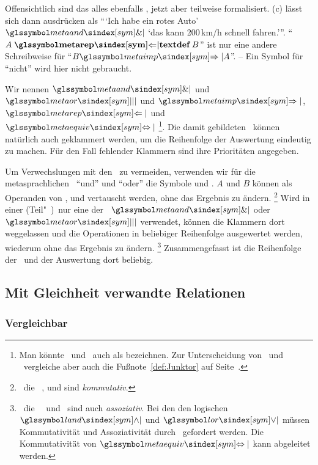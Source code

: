 Offensichtlich sind das alles ebenfalls \Aussagen, jetzt aber teilweise formalisiert.
(c) lässt sich dann ausdrücken als \enquote{\enquote{Ich habe ein rotes Auto} $\symmetaand$ \enquote{das kann 200\,km/h schnell fahren.}}.
\enquote{$A \bindefinition{\symmetarep} B$} ist nur eine andere Schreibweise für \enquote{$B \symmetaimp A$}.
-- Ein Symbol für \enquote{nicht} wird hier nicht gebraucht.

Wir nennen $\symmetaand$ und $\symmetaor$  und $\symmetaimp$, $\symmetarep$ und $\symmetaequiv$ %
\footnote{%
	Man könnte \Metaoperationen\ und \Metarelationen\ auch als  bezeichnen. Zur Unterscheidung von \Operationen\ und \Relationen\ vergleiche aber auch die Fußnote~\ref{def:Junktor} auf Seite~\pageref{def:Junktor}.
}.
Die damit gebildeten \Aussagen\ können natürlich auch geklammert werden, um die Reihenfolge der Auswertung eindeutig zu machen.
Für den Fall fehlender Klammern sind ihre Prioritäten  angegeben.

Um Verwechslungen mit den \Junktoren\ zu vermeiden, verwenden wir für die metasprachlichen \Operationen\ \enquote{und} und \enquote{oder} die Symbole \chrqt{\symmetaand} und \chrqt{\symmetaor}.
$A$ und $B$ können als Operanden von \chrqt{\symmetaequiv}, \chrqt{\symmetaand} und \chrqt{\symmetaor} vertauscht werden, ohne das Ergebnis zu ändern.%
\footnote{%
	\textDh\ die \Operationen\ \chrqt{\symmetaequiv}, \chrqt{\symmetaand} und \chrqt{\symmetaor} sind \emph{kommutativ}.
}
Wird in einer (Teil"~)\Aussage\ nur eine der \Operationen\ $\symmetaand$ oder $\symmetaor$ verwendet, können die Klammern dort weggelassen und die Operationen in beliebiger Reihenfolge ausgewertet werden, wiederum ohne das Ergebnis zu ändern.%
\footnote{%
	\textDh\ die \Operationen\ \symmetaand\ und \symmetaor\ sind auch \emph{assoziativ}.
	Bei den den logischen \Operationen\ $\symland$ und $\symlor$ müssen Kommutativität und Assoziativität durch \Axiome\ gefordert werden.
	Die Kommutativität von $\symmetaequiv$ kann abgeleitet werden.
}
Zusammengefasst ist die Reihenfolge der \Operationen\ und der Auswertung dort beliebig.

\subsection{Mit Gleichheit verwandte Relationen}%
\label{sub:Gleichheit}

\subsubsection{Vergleichbar}%
\label{subsub:Vergleichbar}


